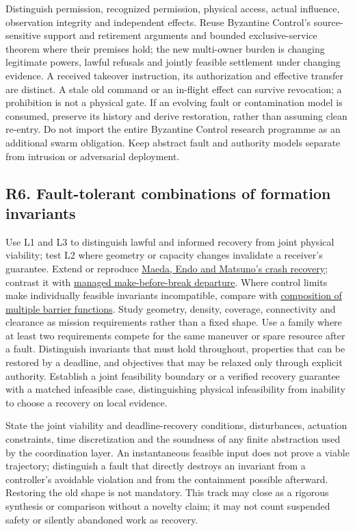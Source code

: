 \documentclass[11pt]{article}
\begin{document}
Distinguish permission, recognized permission, physical access, actual influence, observation integrity and independent effects. Reuse Byzantine Control's source-sensitive support and retirement arguments and bounded exclusive-service theorem where their premises hold; the new multi-owner burden is changing legitimate powers, lawful refusals and jointly feasible settlement under changing evidence. A received takeover instruction, its authorization and effective transfer are distinct. A stale old command or an in-flight effect can survive revocation; a prohibition is not a physical gate. If an evolving fault or contamination model is consumed, preserve its history and derive restoration, rather than assuming clean re-entry. Do not import the entire Byzantine Control research programme as an additional swarm obligation. Keep abstract fault and authority models separate from intrusion or adversarial deployment.

\subsection*{R6. Fault-tolerant combinations of formation invariants}
Use L1 and L3 to distinguish lawful and informed recovery from joint physical viability; test L2 where geometry or capacity changes invalidate a receiver's guarantee. Extend or reproduce \href{https://doi.org/10.1016/j.jfranklin.2023.05.013}{Maeda, Endo and Matsuno's crash recovery}; contrast it with \href{https://arxiv.org/html/2609.29939v1\#S3.SS2.SSS3}{managed make-before-break departure}. Where control limits make individually feasible invariants incompatible, compare with \href{https://arxiv.org/abs/2210.01354}{composition of multiple barrier functions}. Study geometry, density, coverage, connectivity and clearance as mission requirements rather than a fixed shape. Use a family where at least two requirements compete for the same maneuver or spare resource after a fault. Distinguish invariants that must hold throughout, properties that can be restored by a deadline, and objectives that may be relaxed only through explicit authority. Establish a joint feasibility boundary or a verified recovery guarantee with a matched infeasible case, distinguishing physical infeasibility from inability to choose a recovery on local evidence.

State the joint viability and deadline-recovery conditions, disturbances, actuation constraints, time discretization and the soundness of any finite abstraction used by the coordination layer. An instantaneous feasible input does not prove a viable trajectory; distinguish a fault that directly destroys an invariant from a controller's avoidable violation and from the containment possible afterward. Restoring the old shape is not mandatory. This track may close as a rigorous synthesis or comparison without a novelty claim; it may not count suspended safety or silently abandoned work as recovery.
\end{document}
